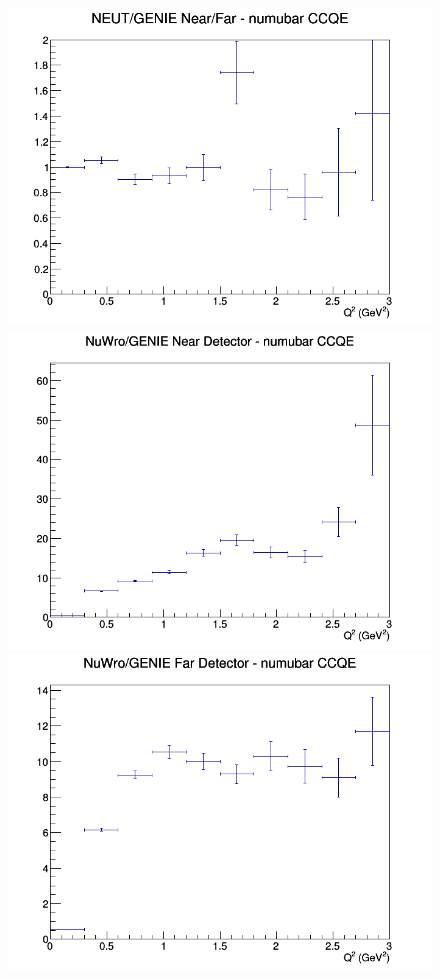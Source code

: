 \begin{figure}[h]
\endminipage
{}
\includegraphics[width=\linewidth]{eff_Q2/LAr/ratios/CCQE_NEUT_GENIE_numubar_NF_Q2.png}
\endminipage
\newline
{}
\includegraphics[width=\linewidth]{eff_Q2/LAr/ratios/CCQE_NuWro_GENIE_numubar_near_Q2.png}
\endminipage
{}
\includegraphics[width=\linewidth]{eff_Q2/LAr/ratios/CCQE_NuWro_GENIE_numubar_far_Q2.png}

\end{figure}
